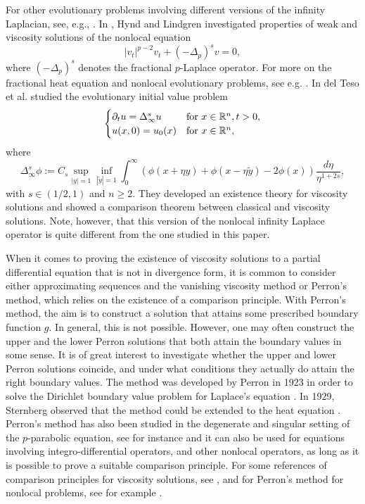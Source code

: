 \documentclass[11pt]{article}
\providecommand{\Rn}{\mathbb{R}^n}
\numberwithin{equation}{section}
\theoremstyle{definition}
\begin{document}
     For other evolutionary problems involving different versions of the infinity Laplacian, see, e.g., \cite{AJK2009,CW2003}. In \cite{HL2016}, Hynd and Lindgren investigated properties of weak and viscosity solutions of the nonlocal equation
     \begin{equation*}
         | v_t|^{p-2}v_t +(-\Delta_p)^s v=0,
     \end{equation*}
     where $(-\Delta_p)^s$ denotes the fractional $p$-Laplace operator. For more on the fractional heat equation and nonlocal evolutionary problems, see e.g. \cite{BPSV2014,   BSV2017, LN2023, NS2016, V2018}. In \cite{TEEV2023} del Teso et al. studied the evolutionary initial value problem
    \begin{align*}
        \begin{cases}
            \partial_t u= \Delta^s_{\infty} u& \textup{for  } x \in \Rn, t >0,\\
        u(x,0) =u_0(x)& \textup{for  } x \in \Rn,
    \end{cases}
\end{align*} 
where 
\begin{equation*}
\Delta^s_{\infty} \phi := C_s \sup_{|y|=1} \inf_{|\tilde{y}|=1}\int_0^{\infty} (\phi(x + \eta y) + \phi(x - \eta \tilde{y}) - 2 \phi(x)) \frac{d \eta}{\eta^{1+2s}},
\end{equation*}
with $s \in (1/2,1)$ and $n\geq 2$. They developed an existence theory for viscosity solutions and showed a comparison theorem between classical and viscosity solutions. Note, however, that this version of the nonlocal infinity Laplace operator is quite different from the one studied in this paper.

When it comes to proving the existence of viscosity solutions to a partial differential equation that is not in divergence form, it is common to consider either approximating sequences and the vanishing viscosity method or Perron's method, which relies on the existence of a comparison principle. With Perron's method, the aim is to construct a solution that attains some prescribed boundary function $g$. In general, this is not possible. However, one may often construct the upper and the lower Perron solutions that both attain the boundary values in some sense. It is of great interest to investigate whether the upper and lower Perron solutions coincide, and under what conditions they actually do attain the right boundary values. The method was developed by Perron in 1923 in order to solve the Dirichlet boundary value problem for Laplace's equation \cite{P1923}. In 1929, Sternberg observed that the method could be extended to the heat equation \cite{S1929}. Perron's method has also been studied in the degenerate and singular setting of the $p$-parabolic equation, see for instance \cite{BBUP2015,KL1996} and it
can also be used for equations involving integro-differential operators, and other nonlocal operators, as long as it is possible to prove a suitable comparison principle. For some references of comparison principles for viscosity solutions, see  \cite{ BI2008, CS2009, CIL1992}, and for Perron's method for nonlocal problems, see for example \cite{BCI2008, bbk2024perron,   I1987, I1989, K2004, K2005, KKP2017, LL2017,  M2017}.
\end{document}
